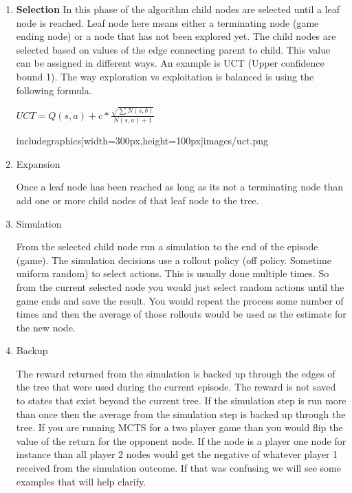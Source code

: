 \begin{enumerate}
    \item \textbf{Selection}
    In this phase of the algorithm child nodes are selected until a leaf node is reached. Leaf node here means either a terminating node (game ending node) or a node that has not been explored yet. The child nodes are selected based on values of the edge connecting parent to child. This value can be assigned in different ways. An example is UCT (Upper confidence bound 1). The way exploration vs exploitation is balanced is using the following formula. 
    
    $ UCT = Q(s,a) + c*\frac{\sqrt{\sum{N(s,b)}}}{N(s,a) + 1} $
    
    includegraphics[width=300px,height=100px]{images/uct.png}
    
    \item Expansion
    
    Once a leaf node has been reached as long as its not a terminating node than add one or more child nodes of that leaf node to the tree. 
    \item Simulation
    
    From the selected child node run a simulation to the end of the episode (game). The simulation decisions use a rollout policy (off policy. Sometime uniform random) to select actions. This is usually done multiple times. So from the current selected node you would just select random actions until the game ends and save the result. You would repeat the process some number of times and then the average of those rollouts would be used as the estimate for the new node. 
    
    \item Backup
    
    The reward returned from the simulation is backed up through the edges of the tree that were used during the current episode. The reward is not saved to states that exist beyond the current tree. If the simulation step is run more than once then the average from the simulation step is backed up through the tree. If you are running MCTS for a two player game than you would flip the value of the return for the opponent node. If the node is a player one node for instance than all  player 2 nodes would get the negative of whatever player 1 received from the simulation outcome. If that was confusing we will see some examples that will help clarify. 
    
\end{enumerate}

